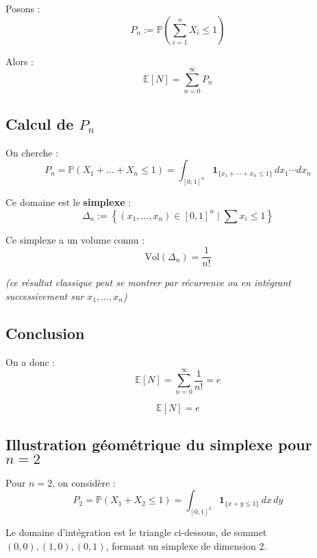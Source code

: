 Posons :
\[
P_n := \mathbb{P} \left( \sum_{i=1}^n X_i \leq 1 \right)
\]

Alors :
\[
\mathbb{E}[N] = \sum_{n=0}^\infty P_n
\]


\subsection*{Calcul de \( P_n \)}

On cherche :
\[
P_n = \mathbb{P}\left( X_1 + \dots + X_n \leq 1 \right)
= \int_{[0,1]^n} \mathbf{1}_{\{x_1 + \cdots + x_n \leq 1\}} \, dx_1 \cdots dx_n
\]

Ce domaine est le \textbf{simplexe} :
\[
\Delta_n := \left\{ (x_1, \dots, x_n) \in [0,1]^n \mid \sum x_i \leq 1 \right\}
\]

Ce simplexe a un volume connu :
\[
\text{Vol}(\Delta_n) = \frac{1}{n!}
\]

\textit{(ce résultat classique peut se montrer par récurrence ou en intégrant successivement sur \( x_1, \dots, x_n \))}

\subsection*{Conclusion}

On a donc :
\[
\mathbb{E}[N] = \sum_{n=0}^\infty \frac{1}{n!} = e
\]

\vspace{0.5em}
\[
\boxed{ \mathbb{E}[N] = e }
\]


\subsection*{Illustration géométrique du simplexe pour \( n = 2 \)}

Pour \( n = 2 \), on considère :
\[
P_2 = \mathbb{P}(X_1 + X_2 \leq 1) = \int_{[0,1]^2} \mathbf{1}_{\{x + y \leq 1\}} \, dx \, dy
\]

Le domaine d'intégration est le triangle ci-dessous, de sommet \( (0,0), (1,0), (0,1) \), formant un simplexe de dimension 2.

\vspace{1em}

\begin{center}

\end{center}

